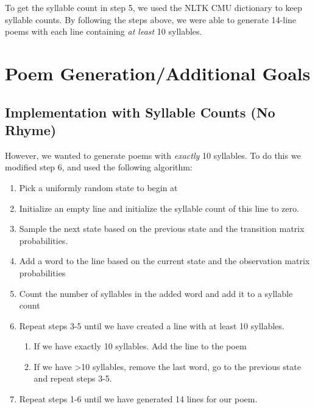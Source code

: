 To get the syllable count in step 5, we used the NLTK CMU dictionary to keep syllable counts. By following the steps above, we were able to generate 14-line poems with each line containing \textit{at least} 10 syllables. 

\section{Poem Generation/Additional Goals}

\subsection*{Implementation with Syllable Counts (No Rhyme)}

However, we wanted to generate poems with \textit{exactly} 10 syllables. To do this we modified step 6, and used the following algorithm:

\begin{enumerate}

\item Pick a uniformly random state to begin at

\item Initialize an empty line and initialize the syllable count of this line to zero.

\item Sample the next state based on the previous state and the transition matrix probabilities.

\item Add a word to the line based on the current state and the observation matrix probabilities

\item Count the number of syllables in the added word and add it to a syllable count

\item Repeat steps 3-5 until we have created a line with at least 10 syllables. 

\begin{enumerate}

\item If we have exactly 10 syllables. Add the line to the poem

\item If we have \textgreater 10 syllables, remove the last word, go to the previous state and repeat steps 3-5.

\end{enumerate}

\item Repeat steps 1-6 until we have generated 14 lines for our poem.

\end{enumerate}
~


